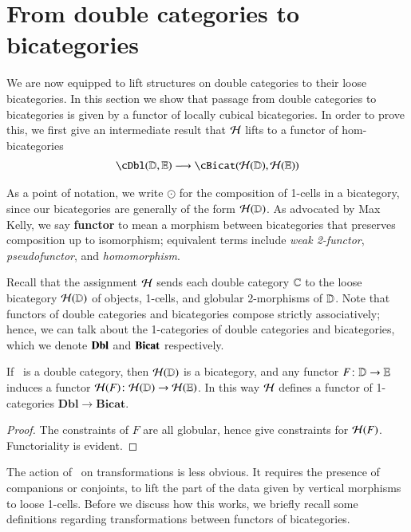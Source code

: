 \section{From double categories to bicategories}
\label{sec:1x1-to-bicat}

We are now equipped to lift structures on double categories to
their loose bicategories.  In this section we show that passage
from double categories to bicategories is given by a functor of locally cubical bicategories. In order to prove this, we first give an intermediate result that $\mathcal{H}$ lifts to a functor of hom-bicategories
\begin{align}
    \cDbl(\lD,\lE) &\too \cBicat(\cH(\lD),\cH(\lE))\\
\end{align}

As a point of notation, we write $\odot$ for the composition of
1-cells in a bicategory, since our bicategories are generally of the
form $\mathcal{H}(\mathbb{D})$.  As advocated by Max Kelly, we say \textbf{functor}
to mean a morphism between bicategories that preserves composition up
to isomorphism; equivalent terms include \emph{weak 2-functor},
\emph{pseudofunctor}, and \emph{homomorphism}.

Recall that the assignment $\mathcal{H}$ sends each double category $\mathbb{C}$ to the loose bicategory  $\mathcal{H}(\mathbb{D})$ of objects, 1-cells, and globular 2-morphisms of $\mathbb{D}$.  Note that functors of double categories and bicategories compose strictly associatively; hence, we can talk about the 1-categories of double categories and bicategories, which we denote ${\bf Dbl}$ and ${\bf Bicat}$ respectively.

\begin{thm}\label{thm:1-func}
 If \lD\ is a double category, then $\mathcal{H}(\mathbb{D})$ is a bicategory, and
  any functor $F\colon \mathbb{D}\to\mathbb{E}$ induces a functor $\mathcal{H}(F)\colon
  \mathcal{H}(\mathbb{D})\to\mathcal{H}(\mathbb{E})$.  In this way $\mathcal{H}$ defines a functor of
  1-categories $\mathbf{Dbl}\to \mathbf{Bicat}$.
\end{thm}
\begin{proof}
 The constraints of $F$ are all globular, hence give constraints for
  $\mathcal{H}(F)$.  Functoriality is evident.
\end{proof}

The action of \cH\ on transformations is less obvious. It
requires the presence of companions or conjoints, to lift the part of the data given by vertical morphisms to loose 1-cells. Before we discuss how this works, we briefly recall some definitions regarding transformations between functors of bicategories.

